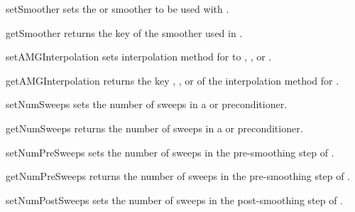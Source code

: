 \begin{methoddesc}[SolverOptions]{setSmoother}{}
sets the \JACOBI or \GAUSSSEIDEL smoother to be used with \AMG.
\end{methoddesc}

\begin{methoddesc}[SolverOptions]{getSmoother}{}
returns the key of the smoother used in \AMG.
\end{methoddesc}

\begin{methoddesc}[SolverOptions]{setAMGInterpolation}{}
sets interpolation method for \AMG to
,
, or
.
\end{methoddesc}

\begin{methoddesc}[SolverOptions]{getAMGInterpolation}{}
returns the key 
,
, or
of the interpolation method for \AMG.
\end{methoddesc}

\begin{methoddesc}[SolverOptions]{setNumSweeps}{}
sets the number of sweeps in a \JACOBI or \GAUSSSEIDEL preconditioner.
\end{methoddesc}

\begin{methoddesc}[SolverOptions]{getNumSweeps}{}
returns the number of sweeps in a \JACOBI or \GAUSSSEIDEL preconditioner.
\end{methoddesc}



\begin{methoddesc}[SolverOptions]{setNumPreSweeps}{}
sets the number of sweeps in the pre-smoothing step of \AMG.
\end{methoddesc}

\begin{methoddesc}[SolverOptions]{getNumPreSweeps}{}
returns the number of sweeps in the pre-smoothing step of \AMG.
\end{methoddesc}

\begin{methoddesc}[SolverOptions]{setNumPostSweeps}{}
sets the number of sweeps in the post-smoothing step of \AMG.
\end{methoddesc}

